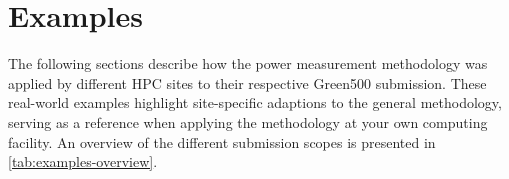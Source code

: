 \chapter{Examples}
\label{sec:examples}

The following sections describe how the power measurement methodology was applied by different HPC sites to their respective Green500 submission.
These real-world examples highlight site-specific adaptions to the general methodology, serving as a reference when applying the methodology at your own computing facility.
An overview of the different submission scopes is presented in \cref{tab:examples-overview}.

\begin{table}[h!]
    \centering
	\caption{Overview of Green500 submission examples from different sites and clusters.}
	\label{tab:examples-overview}
\end{table}


